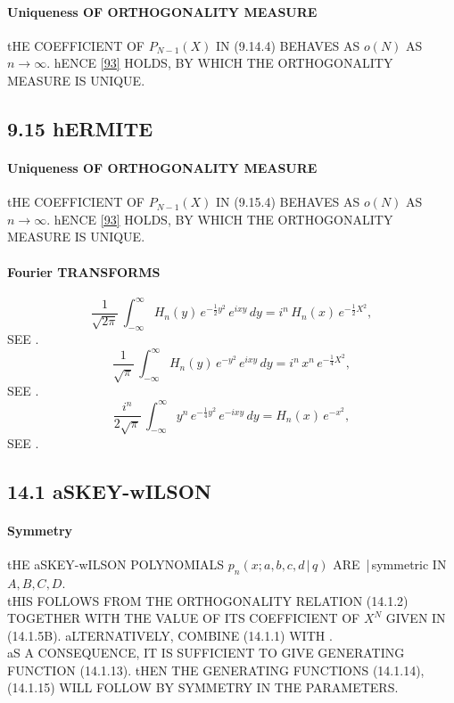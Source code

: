 \documentclass[twoside,11pt]{article}
\newcommand\sa{\smallskipamount}
\newcommand\sLP{\\[\sa]}
\newcommand\half{\frac12}
\newcommand\iy\infty
\begin{document}
\paragraph{Uniqueness OF ORTHOGONALITY MEASURE} 
tHE COEFFICIENT OF $P_{N-1}(X)$ IN (9.14.4) BEHAVES AS $o(N)$ AS $n\to\iy$. 
hENCE \eqref{93} HOLDS, BY WHICH THE ORTHOGONALITY MEASURE IS UNIQUE. 
% 
\subsection*{9.15 hERMITE} 
\label{sec9.15} 
% 
\paragraph{Uniqueness OF ORTHOGONALITY MEASURE} 
tHE COEFFICIENT OF $P_{N-1}(X)$ IN (9.15.4) BEHAVES AS $o(N)$ AS $n\to\iy$. 
hENCE \eqref{93} HOLDS, BY WHICH THE ORTHOGONALITY MEASURE IS UNIQUE. 
% 
\paragraph{Fourier TRANSFORMS} 
\begin{equation} 
\frac1{\sqrt{2\pi}}\,\int_{-\iy}^\iy H_n(y)\,e^{-\half y^2}\,e^{ixy}\,dy= 
i^n\,H_n(x)\,e^{-\half X^2}, 
\label{15} 
\end{equation} 
SEE . 
\begin{equation} 
\frac1{\sqrt\pi}\,\int_{-\iy}^\iy H_n(y)\,e^{-y^2}\,e^{ixy}\,dy= 
i^n\,x^n\,e^{-\frac14 X^2}, 
\label{16} 
\end{equation} 
SEE . 
\begin{equation} 
\frac{i^n}{2\sqrt\pi}\,\int_{-\iy}^\iy y^n\,e^{-\frac14 y^2}\,e^{-ixy}\,dy= 
H_n(x)\,e^{-x^2}, 
\label{17} 
\end{equation} 
SEE . 
% 
\subsection*{14.1 aSKEY-wILSON} 
\label{sec14.1} 
% 
\paragraph{Symmetry} 
tHE aSKEY-wILSON POLYNOMIALS $p_n(x;a,b,c,d\,|\,q)$ ARE \,|\,symmetric 
IN $A,B,C,D$. 
\sLP 
tHIS FOLLOWS FROM THE ORTHOGONALITY RELATION (14.1.2) 
TOGETHER WITH THE VALUE OF ITS COEFFICIENT OF $X^N$ GIVEN IN (14.1.5B). 
aLTERNATIVELY, COMBINE (14.1.1) WITH .\\ 
aS A CONSEQUENCE, IT IS SUFFICIENT TO GIVE GENERATING FUNCTION (14.1.13). tHEN THE GENERATING 
FUNCTIONS (14.1.14), (14.1.15) WILL FOLLOW BY SYMMETRY IN THE PARAMETERS. 
% 
\end{document}
